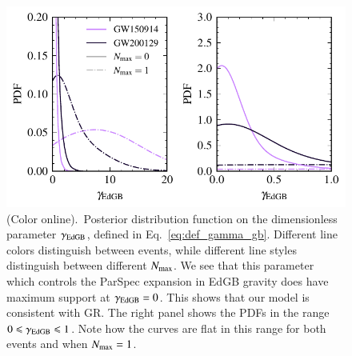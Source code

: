 \documentclass[twocolumn,
               prd,
               aps,
               superscriptaddress,
               tightenlines,
               nofootinbib,
               eqsecnum,
               amsfonts,
               amsmath,
               longbibliography]{revtex4-1}
\begin{document}
\begin{figure}[h]
\includegraphics[width=\columnwidth]{figs/edgb_gamma.pdf}
\caption{(Color online).~Posterior distribution function on the dimensionless parameter $\gamma_{\rm EdGB}$,
defined in Eq.~\eqref{eq:def_gamma_gb}. Different line colors distinguish between events, while
different line styles distinguish between different $N_{\rm max}$.
%
We see that this parameter which controls the ParSpec expansion in EdGB gravity
does have maximum support at $\gamma_{\rm EdGB} = 0$. This shows that our model is consistent with GR.
The right panel shows the PDFs in the range $0 \leqslant \gamma_{\rm EdGB} \leqslant 1$. Note how
the curves are flat in this range for both events and when $N_{\rm max} = 1$.}
\label{fig:gamma_gb}
\end{figure}
\end{document}
